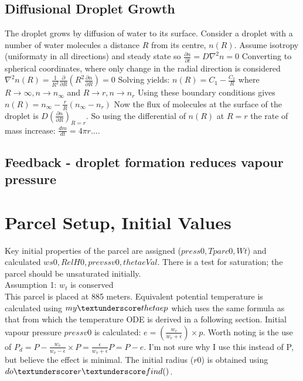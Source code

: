 \documentclass[11pt]{article} %
\begin{document}
\subsection{Diffusional Droplet Growth}

The droplet grows by diffusion of water to its surface.  Consider a droplet with a number of water molecules a distance $R$ from its centre, $n(R)$.  Assume isotropy (uniformaty in all directions) and steady state so $\frac{\partial n}{\partial t} = D \nabla^{2} n = 0$  Converting to spherical coordinates, where only change in the radial direction is considered $\nabla^{2}n(R) = \frac{1}{R^{2}}\frac{\partial}{\partial R} \left( R^{2} \frac{\partial n}{\partial R} \right) = 0$ Solving yields: $n(R) = C_{1} - \frac{C_{2}}{R}$ where $R \rightarrow \infty, n \rightarrow n_{\infty}$ and $R \rightarrow r, n \rightarrow n_{r}$ Using these boundary conditions gives $n(R) = n_{\infty} - \frac{r}{R}(n_{\infty} - n_{r})$ Now the flux of molecules at the surface of the droplet is $D \left( \frac{\partial n}{\partial R} \right)_{R = r}$. So using the differential of $n(R)$  at $R = r$ the rate of mass increase: $\frac{dm}{dt} = 4 \pi r....$ 
  
\subsection{Feedback - droplet formation reduces vapour pressure}


\section{Parcel Setup, Initial Values}

Key initial properties of the parcel are assigned ($press0, Tparc0, Wt$) and calculated $ws0, RelH0, prevssv0, thetaeVal$.  There is a test for saturation; the parcel should be unsaturated initially.\\

Assumption 1: $w_{t}$  is conserved\\

This parcel is placed at 885 meters. Equivalent potential temperature is calculated using $my \textunderscore thetaep$ which uses the same formula as that from which the temperature ODE is derived in a following section.  Initial vapour pressure $pressv0$ is calculated: $e = \left( \frac{w_{v}}{w_{v} + \epsilon } \right) \times p $.   Worth noting is the use of  $P_{d} = P - \frac{w_{v}}{w_{v} - \epsilon} \times P = \frac{\epsilon}{w_{v} + \epsilon} P = P - e$.  I'm not sure why I use this instead of P, but believe the effect is minimal.  The initial radius ($r0$) is obtained using $do \textunderscore r \textunderscore find()$. 
\end{document}
